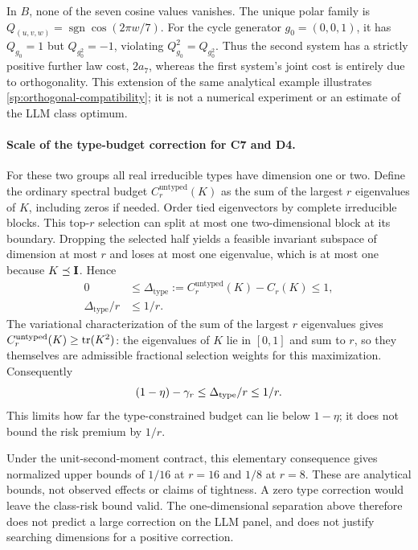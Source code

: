 In $B$, none of the seven cosine values vanishes. The unique polar family is $Q_{(u,v,w)}=\operatorname{sgn}\cos(2\pi w/7)$. For the cycle generator $g_0=(0,0,1)$, it has $Q_{g_0}=1$ but $Q_{g_0^2}=-1$, violating $Q_{g_0}^2=Q_{g_0^2}$. Thus the second system has a strictly positive further law cost, $2a_7$, whereas the first system's joint cost is entirely due to orthogonality. This extension of the same analytical example illustrates \cref{sp:orthogonal-compatibility}; it is not a numerical experiment or an estimate of the LLM class optimum.

\paragraph{Scale of the type-budget correction for C7 and D4.}
\label{sp:type-scale}
For these two groups all real irreducible types have dimension one or two. Define the ordinary spectral budget $C_r^{\mathrm{untyped}}(K)$ as the sum of the largest $r$ eigenvalues of $K$, including zeros if needed. Order tied eigenvectors by complete irreducible blocks. This top-$r$ selection can split at most one two-dimensional block at its boundary. Dropping the selected half yields a feasible invariant subspace of dimension at most $r$ and loses at most one eigenvalue, which is at most one because $K\preceq\mathbf{I}$. Hence
\[
 \begin{aligned}
 0
 &\le
 \Delta_{\mathrm{type}}
 :=
 C_r^{\mathrm{untyped}}(K)-C_r(K)
 \le1,
 \\
 \Delta_{\mathrm{type}}/r&\le1/r.
 \end{aligned}
\]
The variational characterization of the sum of the largest $r$ eigenvalues gives $C_r^{\rm untyped}(K)\ge\operatorname{tr}(K^2)$: the eigenvalues of $K$ lie in $[0,1]$ and sum to $r$, so they themselves are admissible fractional selection weights for this maximization. Consequently
\[
 (1-\eta)-\gamma_r\le\Delta_{\rm type}/r\le1/r.
\]
This limits how far the type-constrained budget can lie below $1-\eta$; it does not bound the risk premium by $1/r$.

Under the unit-second-moment contract, this elementary consequence gives normalized upper bounds of $1/16$ at $r=16$ and $1/8$ at $r=8$. These are analytical bounds, not observed effects or claims of tightness. A zero type correction would leave the class-risk bound valid. The one-dimensional separation above therefore does not predict a large correction on the LLM panel, and does not justify searching dimensions for a positive correction.

